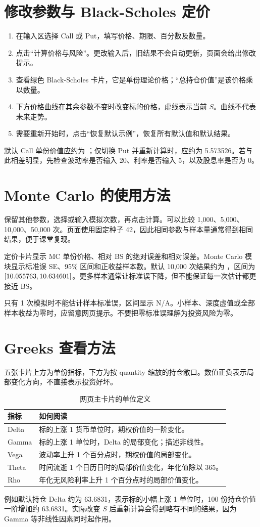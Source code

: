 \documentclass[UTF8,a4paper,12pt]{ctexart}
\begin{document}
\section{修改参数与 Black-Scholes 定价}
\begin{enumerate}
\item 在输入区选择 Call 或 Put，填写价格、期限、百分数及数量。
\item 点击“计算价格与风险”。更改输入后，旧结果不会自动更新，页面会给出修改提示。
\item 查看绿色 Black-Scholes 卡片，它是单份理论价格；“总持仓价值”是该价格乘以数量。
\item 下方价格曲线在其余参数不变时改变标的价格，虚线表示当前 $S$。曲线不代表未来走势。
\item 需要重新开始时，点击“恢复默认示例”，恢复所有默认值和默认结果。
\end{enumerate}
默认 Call 单份价值应约为 \BSPrice；仅切换 Put 并重新计算时，应约为 5.573526。若与此相差明显，先检查波动率是否输入 20、利率是否输入 5，以及股息率是否为 0。
\newpage

\section{Monte Carlo 的使用方法}
保留其他参数，选择或输入模拟次数，再点击计算。可以比较 1,000、5,000、10,000、50,000 次。页面使用固定种子 42，因此相同参数与样本量通常得到相同结果，便于课堂复现。

定价卡片显示 MC 单份价格、相对 BS 的绝对误差和相对误差。Monte Carlo 模块显示标准误 SE、95\% 区间和正收益样本数。默认 10,000 次结果约为 \MCPrice，区间为 $[10.055763,10.634601]$。更多样本通常让标准误下降，但不能保证每一次估计都更接近 BS。

只有 1 次模拟时不能估计样本标准误，区间显示 N/A。小样本、深度虚值或全部样本收益为零时，应留意网页提示。不要把零标准误理解为投资风险为零。

\section{Greeks 查看方法}
五张卡片上方为单份指标，下方为按 quantity 缩放的持仓敞口。数值正负表示局部变化方向，不直接表示投资好坏。
\begin{table}[H]\centering\small
\begin{tabularx}{\linewidth}{lX}\toprule 指标 & 如何阅读\\\midrule
Delta & 标的上涨 1 货币单位时，期权价值的一阶变化。\\
Gamma & 标的上涨 1 单位时，Delta 的局部变化；描述非线性。\\
Vega & 波动率上升 1 个百分点时，期权价值的局部变化。\\
Theta & 时间流逝 1 个日历日时的局部价值变化，年化值除以 365。\\
Rho & 年化无风险利率上升 1 个百分点时的局部价值变化。\\\bottomrule
\end{tabularx}\caption{网页主卡片的单位定义}
\end{table}
例如默认持仓 Delta 约为 63.6831，表示标的小幅上涨 1 单位时，100 份持仓价值一阶增加约 63.6831。实际改变 $S$ 后重新计算会得到略有不同的结果，因为 Gamma 等非线性因素同时起作用。
\end{document}
